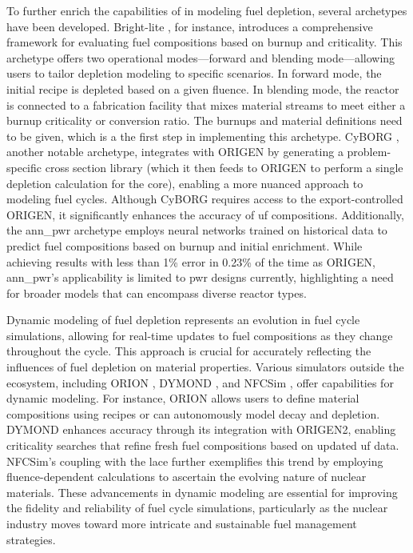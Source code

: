 To further enrich the capabilities of \cyclus in modeling fuel depletion, several archetypes have been developed. Bright-lite \cite{schneider_integrated_2016}, for instance, introduces a comprehensive framework for evaluating fuel compositions based on burnup and criticality. This archetype offers two operational modes—forward and blending mode—allowing users to tailor depletion modeling to specific scenarios. In forward mode, the initial recipe is depleted based on a given fluence. In blending mode, the reactor is connected to a fabrication facility that mixes material streams to meet either a burnup criticality or conversion ratio. The burnups and material definitions need to be given, which is a the first step in implementing this archetype. CyBORG \cite{skutnik_cyborg_2016}, another notable archetype, integrates \cyclus with ORIGEN by generating a problem-specific cross section library (which it then feeds to ORIGEN to perform a single depletion calculation for the core), enabling a more nuanced approach to modeling fuel cycles. Although CyBORG requires access to the export-controlled ORIGEN, it significantly enhances the accuracy of \gls{uf} compositions. Additionally, the ann\_pwr \cite{bae_deep_2020} archetype employs neural networks trained on historical data to predict fuel compositions based on burnup and initial enrichment. While achieving results with less than 1\% error in 0.23\% of the time as ORIGEN, ann\_pwr's applicability is limited to \gls{pwr} designs currently, highlighting a need for broader models that can encompass diverse reactor types.

Dynamic modeling of fuel depletion represents an evolution in fuel cycle simulations, allowing for real-time updates to fuel compositions as they change throughout the cycle. This approach is crucial for accurately reflecting the influences of fuel depletion on material properties. Various simulators outside the \cyclus ecosystem, including ORION \cite{feng_standardized_2016}, DYMOND \cite{richards_application_2021}, and NFCSim \cite{schneider_nfcsim_2005}, offer capabilities for dynamic modeling. For instance, ORION allows users to define material compositions using recipes or can autonomously model decay and depletion. DYMOND enhances accuracy through its integration with ORIGEN2, enabling criticality searches that refine fresh fuel compositions based on updated \gls{uf} data. NFCSim's coupling with the \gls{lace} further exemplifies this trend by employing fluence-dependent calculations to ascertain the evolving nature of nuclear materials. These advancements in dynamic modeling are essential for improving the fidelity and reliability of fuel cycle simulations, particularly as the nuclear industry moves toward more intricate and sustainable fuel management strategies.

